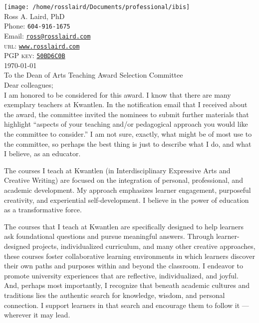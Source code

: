\documentclass[12pt, letterpaper]{article}
\begin{document}
    \thispagestyle{empty}
    \reversemarginpar
    \noindent
    \texttt{[image: /home/rosslaird/Documents/professional/ibis]}\\[1em]
    {\LARGE Ross A. Laird, PhD}\\[1em]
    Phone: \texttt{604-916-1675}\\
    Email: \texttt{\href{mailto:ross@rosslaird.com}{ross@rosslaird.com}}\\
    \textsc{url}: \texttt{\href{http://www.rosslaird.com}{www.rosslaird.com}}\\
    \textsc{PGP key}: \href{http://keyserver.ubuntu.com:11371/pks/lookup?op=get&search=0x623D9CC650BD6C0B}{\texttt{50BD6C0B}}
    \\[4em]
\noindent
\today\\
To the Dean of Arts Teaching Award Selection Committee
\\[2em]
Dear colleagues;
\\[1em]
I am honored to be considered for this award. I know that there are many exemplary teachers at Kwantlen. In the notification email that I received about the award, the committee invited the nominees to submit further materials that highlight “aspects of your teaching and/or pedagogical approach you would like the committee to consider.” I am not sure, exactly, what might be of most use to the committee, so perhaps the best thing is just to describe what I do, and what I believe, as an educator.

The courses I teach at Kwantlen (in Interdisciplinary Expressive Arts and
Creative Writing) are focused on the integration of personal, professional, and
academic development. My approach emphasizes learner engagement, purposeful
creativity, and experiential self-development. I believe in the power of education as a transformative force.

The courses that I teach at Kwantlen  are specifically designed to help learners ask foundational questions and pursue meaningful answers. Through learner-designed projects, individualized curriculum, and many other creative approaches, these courses foster collaborative learning environments in which learners discover their own paths and purposes within and beyond the classroom. I endeavor to promote university experiences that are reflective, individualized, and joyful. And, perhaps most importantly, I recognize that beneath academic cultures and traditions lies the authentic search for knowledge, wisdom, and personal connection. I support learners in that search and encourage them to follow it — wherever it may lead.
\end{document}
